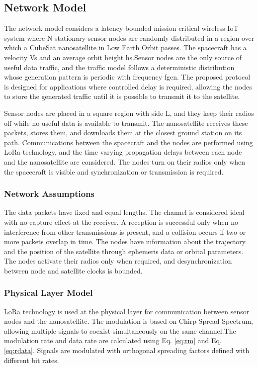 \documentclass[a4paper,fleqn]{cas-dc}
\numberwithin{equation}{section}
\begin{document}
\subsection{Network Model}

The network model considers a latency bounded mission critical wireless IoT system where N stationary sensor nodes are randomly distributed in a region over which a CubeSat nanosatellite in Low Earth Orbit passes. The spacecraft has a velocity Vs and an average orbit height hs.Sensor nodes are the only source of useful data traffic, and the traffic model follows a deterministic distribution whose generation pattern is periodic with frequency f{gen}. The proposed protocol is designed for applications where controlled delay is required, allowing the nodes to store the generated traffic until it is possible to transmit it to the satellite.

Sensor nodes are placed in a square region with side L, and they keep their radios off while no useful data is available to transmit. The nanosatellite receives these packets, stores them, and downloads them at the closest ground station on its path. Communications between the spacecraft and the nodes are performed using LoRa technology, and the time varying propagation delays between each node and the nanosatellite are considered. The nodes turn on their radios only when the spacecraft is visible and synchronization or transmission is required.

\subsubsection{Network Assumptions}

The data packets have fixed and equal lengths. The channel is considered ideal with no capture effect at the receiver. A reception is successful only when no interference from other transmissions is present, and a collision occurs if two or more packets overlap in time. The nodes have information about the trajectory and the position of the satellite through ephemeris data or orbital parameters. The nodes activate their radios only when required, and desynchronization between node and satellite clocks is bounded.

\subsubsection{Physical Layer Model}

LoRa technology is used at the physical layer for communication between sensor nodes and the nanosatellite. The modulation is based on Chirp Spread Spectrum, allowing multiple signals to coexist simultaneously on the same channel.The modulation rate and data rate are calculated using Eq. \ref{eq:rm} and Eq. \ref{eq:rdata}. Signals are modulated with orthogonal spreading factors defined with different bit rates.
\end{document}

